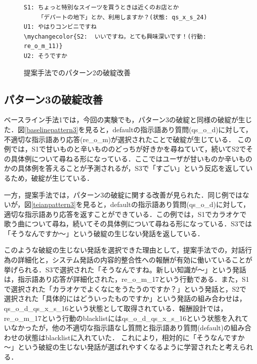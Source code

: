 \documentclass[12pt,a4paper,twoside,openany]{jbook}
\newcommand\mychangecolor[1]{\textcolor[rgb]{1,0,0}{\textbf{#1}}}
\begin{document}
\begin{figure}[tb]
\centering
\begin{screen}
\begin{Verbatim}[commandchars=\\\{\}]
S1: ちょっと特別なスイーツを買うときは近くのお店とか
    「デパートの地下」とか、利用しますか？(状態: qs_x_s_24)
U1: やはりコンビニですね
\mychangecolor{S2:  いいですね，とても興味深いです！(行動: re_o_m_11)}
U2: そうですか
\end{Verbatim}
\end{screen}
\caption{提案手法でのパターン2の破綻改善}
\label{teianpattern2}
\end{figure}

\subsection*{パターン3の破綻改善}
ベースライン手法1では，今回の実験でも，パターン3の破綻と同様の破綻が生じた．図\ref{baselinepattern3}を見ると，defaultの指示語あり質問(qs\_o\_d)に対して，不適切な指示語あり応答(re\_o\_m)が選択されたことで破綻が生じている．
この例では，S1で甘いものと辛いもののどっちが好きかを尋ねていて，続いてS2でその具体例について尋ねる形になっている．ここではユーザが甘いものか辛いものかの具体例を答えることが予測されるが，S3で「すごい」という反応を返しているため，破綻が生じている．

一方，提案手法では，パターン3の破綻に関する改善が見られた．同じ例ではないが，図\ref{teianpattern3}を見ると，defaultの指示語あり質問(qs\_o\_d)に対して，適切な指示語あり応答を返すことができている．この例では，S1でカラオケで歌う曲について尋ね，続いてその具体例について尋ねる形になっている．S3では「そうなんですか～」という破綻の生じない発話を返している．

このような破綻の生じない発話を選択できた理由として，提案手法での，対話行為の詳細化と，システム発話の内容的整合性への報酬が有効に働いていることが挙げられる．S3で選択された「そうなんですね。新しい知識が～」という発話は，指示語あり応答が詳細化された，re\_o\_m\_17という行動である．また，S1で選択された「カラオケでよくなにをうたうのですか？」という発話と，S2で選択された「具体的にはどういったものですか」という発話の組み合わせは，qs\_o\_d\_qs\_x\_s\_16という状態として取得されている．報酬設計では，re\_o\_m\_17という行動のblacklistにはqs\_o\_d\_qs\_x\_s\_16という状態を入れていなかったが，他の不適切な指示語なし質問と指示語あり質問(default)の組み合わせの状態はblacklistに入れていた．
これにより，相対的に「そうなんですか～」という破綻の生じない発話が選ばれやすくなるように学習されたと考えられる．
\end{document}
